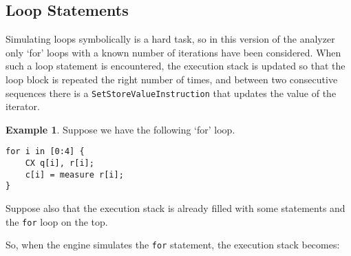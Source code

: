 \documentclass[12pt,a4paper]{report}
\theoremstyle{definition}
\theoremstyle{definition}
\newtheorem{example}{Example}[section]
\theoremstyle{definition}
\begin{document}
\subsection{Loop Statements}
Simulating loops symbolically is a hard task, so in this version of the analyzer only `for' loops with a known number of iterations have been considered. When such a loop statement is encountered, the execution stack is updated so that the loop block is repeated the right number of times, and between two consecutive sequences there is a \texttt{SetStoreValueInstruction} that updates the value of the iterator.
\begin{example}
Suppose we have the following `for' loop.
\begin{lstlisting}
for i in [0:4] {
    CX q[i], r[i];
    c[i] = measure r[i];
}
\end{lstlisting}
Suppose also that the execution stack is already filled with some statements and the \texttt{for} loop on the top.
\begin{center}
\end{center}
So, when the engine simulates the \texttt{for} statement, the execution stack becomes:
\begin{center}
\end{center}
\end{example}
\end{document}
